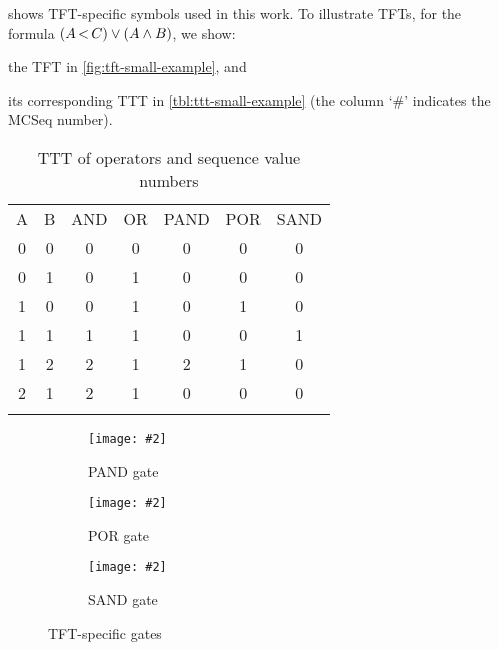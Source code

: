 \documentclass[12pt,openright,twoside,a4paper,oldfontcommands,english,brazil,draft]{abntex2}
\theoremstyle{theo}
\newcommand{\includegraphicsaspectratio}[2][1]{%
  \texttt{[image: \#2]}%
}
\newcommand{\parsin}[1]{\ensuremath\left( #1 \right)}
\def\pand{\ensuremath\operatorname{<}}
\begin{document}
%
 shows \ac{TFT}-specific symbols used in this work.
To illustrate \acp{TFT}, for the formula $\parsin{A \pand C} \lor \parsin{A \land B}$, we show:
\begin{alineasinline}
  \item the \ac{TFT} in \cref{fig:tft-small-example}, and
  \item its corresponding \ac{TTT} in \cref{tbl:ttt-small-example} (the column `\#' indicates the \ac{MCSeq} number).
\end{alineasinline}

\begin{table}
\caption{\acs{TTT} of  operators and sequence value numbers}
\label{tbl:tft-operators}
\centering
\begin{tabular}{ccccccc}
\hline\noalign{\smallskip}
A & B & \ac{AND} & \ac{OR} & \ac{PAND} & \ac{POR} & \ac{SAND}  \\
\noalign{\smallskip}\hline\noalign{\smallskip}
0 & 0 & 0 & 0 & 0 & 0 & 0\\
0 & 1 & 0 & 1 & 0 & 0 & 0\\
1 & 0 & 0 & 1 & 0 & 1 & 0\\
1 & 1 & 1 & 1 & 0 & 0 & 1\\
1 & 2 & 2 & 1 & 2 & 1 & 0\\
2 & 1 & 2 & 1 & 0 & 0 & 0\\
\noalign{\smallskip}\hline
\end{tabular}
\end{table}

\begin{figure}[t]
  \centering
  \begin{subfigure}[b]{0.15\linewidth}
    \centering
    \includegraphicsaspectratio[0.75]{ft-symbol-pand-gate}
    \caption{\ac{PAND} gate}\label{fig:tft-pand-gate}
  \end{subfigure}
  \begin{subfigure}[b]{0.15\linewidth}
    \centering
    \includegraphicsaspectratio[0.75]{ft-symbol-por-gate}
    \caption{\ac{POR} gate}\label{fig:tft-por-gate}
  \end{subfigure}
  \begin{subfigure}[b]{0.15\linewidth}
    \centering
    \includegraphicsaspectratio[0.75]{ft-symbol-sand-gate}
    \caption{\ac{SAND} gate}\label{fig:tft-sand-gate}
  \end{subfigure}
  \caption{\acs{TFT}-specific gates}
  \label{fig:tft-symbols}
\end{figure}
\end{document}

